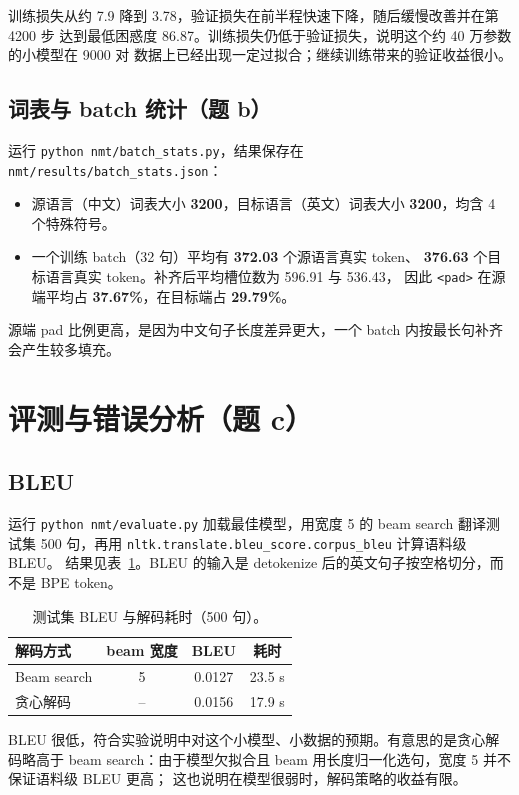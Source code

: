 \documentclass[UTF8,a4paper,11pt]{ctexart}
\begin{document}
训练损失从约 7.9 降到 3.78，验证损失在前半程快速下降，随后缓慢改善并在第 4200 步
达到最低困惑度 86.87。训练损失仍低于验证损失，说明这个约 40 万参数的小模型在 9000 对
数据上已经出现一定过拟合；继续训练带来的验证收益很小。

\subsection{词表与 batch 统计（题 b）}
运行 \texttt{python nmt/batch\_stats.py}，结果保存在
\texttt{nmt/results/batch\_stats.json}：
\begin{itemize}
  \item[(i)] 源语言（中文）词表大小 \textbf{3200}，目标语言（英文）词表大小
        \textbf{3200}，均含 4 个特殊符号。
  \item[(ii)] 一个训练 batch（32 句）平均有 \textbf{372.03} 个源语言真实 token、
        \textbf{376.63} 个目标语言真实 token。补齐后平均槽位数为 596.91 与 536.43，
        因此 \texttt{<pad>} 在源端平均占 \textbf{37.67\%}，在目标端占 \textbf{29.79\%}。
\end{itemize}
源端 pad 比例更高，是因为中文句子长度差异更大，一个 batch 内按最长句补齐会产生较多填充。

\section{评测与错误分析（题 c）}

\subsection{BLEU}
运行 \texttt{python nmt/evaluate.py} 加载最佳模型，用宽度 5 的 beam search 翻译测试集
500 句，再用 \texttt{nltk.translate.bleu\_score.corpus\_bleu} 计算语料级 BLEU。
结果见表~\ref{tab:bleu}。BLEU 的输入是 detokenize 后的英文句子按空格切分，而不是 BPE token。

\begin{table}[H]
\centering
\caption{测试集 BLEU 与解码耗时（500 句）。}
\label{tab:bleu}
\begin{tabular}{lccc}
\toprule
解码方式 & beam 宽度 & BLEU & 耗时 \\
\midrule
Beam search & 5 & 0.0127 & 23.5 s \\
贪心解码 & -- & 0.0156 & 17.9 s \\
\bottomrule
\end{tabular}
\end{table}

BLEU 很低，符合实验说明中对这个小模型、小数据的预期。有意思的是贪心解码略高于
beam search：由于模型欠拟合且 beam 用长度归一化选句，宽度 5 并不保证语料级 BLEU 更高；
这也说明在模型很弱时，解码策略的收益有限。
\end{document}
